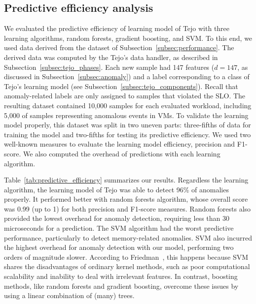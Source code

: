 \subsection{Predictive efficiency analysis}

We evaluated the predictive efficiency of learning model of Tejo with three learning algorithms, random forests, gradient boosting, and SVM. To this end, we used data derived from the dataset of Subsection~\ref{subsec:performance}. The derived data was computed by the Tejo's data handler, as described in Subsection~\ref{subsec:tejo_phases}. Each new sample had 147 features ($d=147$, as discussed in Subsection~\ref{subsec:anomaly}) and a label corresponding to a class of Tejo's learning model (see Subsection~\ref{subsec:tejo_components}). Recall that anomaly-related labels are only assigned to samples that violated the SLO. The resulting dataset contained 10,000 samples for each evaluated workload, including 5,000 of samples representing anomalous events in VMs. To validate the learning model properly, this dataset was split in two uneven parts: three-fifths of data for training the model and two-fifths for testing its predictive efficiency. We used two well-known measures to evaluate the learning model efficiency, precision and F1-score. We also computed the overhead of predictions with each learning algorithm.

Table~\ref{tab:predictive_efficiency} summarizes our results. Regardless the learning algorithm, the learning model of Tejo was able to detect 96\% of anomalies properly. It performed better with random forests algorithm, whose overall score was 0.99 (up to 1) for both precision and F1-score measures. Random forests also provided the lowest overhead for anomaly detection, requiring less than 30 microseconds for a prediction. The SVM algorithm had the worst predictive performance, particularly to detect memory-related anomalies. SVM also incurred the highest overhead for anomaly detection with our model, performing two orders of magnitude slower. According to Friedman~\cite{friedman2006recent}, this happens because SVM shares the disadvantages of ordinary kernel methods, such as poor computational scalability and inability to deal with irrelevant features. In contrast, boosting methods, like random forests and gradient boosting, overcome these issues by using a linear combination of (many) trees.

